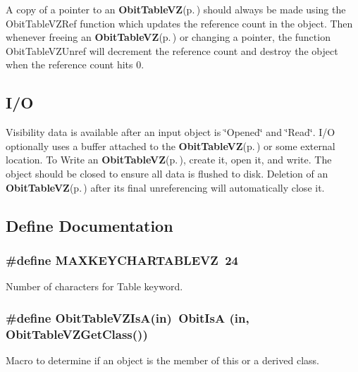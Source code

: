 A copy of a pointer to an {\bf Obit\-Table\-VZ}{\rm (p.\,\pageref{structObitTableVZ})} should always be made using the Obit\-Table\-VZRef function which updates the reference count in the object. Then whenever freeing an {\bf Obit\-Table\-VZ}{\rm (p.\,\pageref{structObitTableVZ})} or changing a pointer, the function Obit\-Table\-VZUnref will decrement the reference count and destroy the object when the reference count hits 0.\subsection{I/O}\label{ObitTableVZ_8h_ObitTableVZUsage}
Visibility data is available after an input object is \char`\"{}Opened\char`\"{} and \char`\"{}Read\char`\"{}. I/O optionally uses a buffer attached to the {\bf Obit\-Table\-VZ}{\rm (p.\,\pageref{structObitTableVZ})} or some external location. To Write an {\bf Obit\-Table\-VZ}{\rm (p.\,\pageref{structObitTableVZ})}, create it, open it, and write. The object should be closed to ensure all data is flushed to disk. Deletion of an {\bf Obit\-Table\-VZ}{\rm (p.\,\pageref{structObitTableVZ})} after its final unreferencing will automatically close it.

\subsection{Define Documentation}
\subsubsection{\setlength{\rightskip}{0pt plus 5cm}\#define MAXKEYCHARTABLEVZ\ 24}\label{ObitTableVZ_8h_a0}


Number of characters for Table keyword. 

\subsubsection{\setlength{\rightskip}{0pt plus 5cm}\#define Obit\-Table\-VZIs\-A(in)\ Obit\-Is\-A (in, Obit\-Table\-VZGet\-Class())}\label{ObitTableVZ_8h_a3}


Macro to determine if an object is the member of this or a derived class. 

